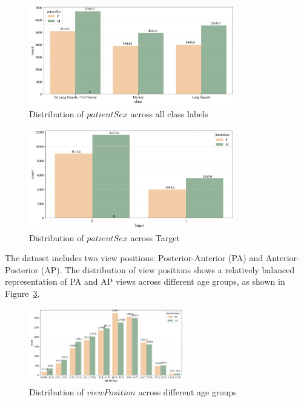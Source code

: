 \begin{figure}[H]
    \begin{center}
        \includegraphics[width = 0.8\textwidth]{figures/Figure11.png}
        \caption{Distribution of $patientSex$ across all class labels}
        \label{fig:cha-2 figure6}
    \end{center}
\end{figure}

\begin{figure}[H]
    \begin{center}
        \includegraphics[width = 0.8\textwidth]{figures/Figure12.png}
        \caption{Distribution of $patientSex$ across Target}
        \label{fig:cha-2 figure7}
    \end{center}
\end{figure}

The dataset includes two view positions: Posterior-Anterior (PA) and Anterior-Posterior (AP). The distribution of view positions shows a relatively balanced representation of PA and AP views across different age groups, as shown in Figure~\ref{fig:cha-2 figure8}.

\begin{figure}[H]
    \begin{center}
        \includegraphics[width = 0.6\textwidth]{figures/Figure9.png}
        \caption{Distribution of $viewPosition$ across different age groups}
        \label{fig:cha-2 figure8}
    \end{center}
\end{figure}


